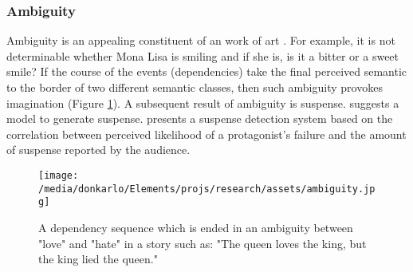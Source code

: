 \documentclass{article}
\begin{document}
	\subsubsection{Ambiguity}
	Ambiguity is an appealing constituent of an work of art \citep{muth-2015-the-appeal-of-challenge-in-the-perception-of-art-how-ambiguity-solvability-of-ambiguity-and-the-opportunity-for-insight-affect-appreciation}. For example, it is not determinable whether Mona Lisa is smiling and if she is, is it a bitter or a sweet smile? If the course of the events (dependencies) take the final perceived semantic to the border of two different semantic classes, then such ambiguity provokes imagination (Figure \ref{fig:ambiguity}). A subsequent result of ambiguity is suspense.
	\citet{cheong-2006-a-computational-model-of-narrative-generation-for-suspense} suggests a model to generate suspense. \citet{oneill-2011-toward-a-computational-framework-of-suspense-and-dramatic-arc} presents a suspense detection system based on the correlation between perceived likelihood of a protagonist’s failure and the amount of suspense reported by the audience.
	\begin{figure}[h!]
		\centering
		\texttt{[image: /media/donkarlo/Elements/projs/research/assets/ambiguity.jpg]}
		\caption{A dependency sequence which is ended in an ambiguity between "love" and "hate" in a story such as: "The queen loves the king, but the king lied the queen."} 
		\label{fig:ambiguity}
	\end{figure}
\end{document}
